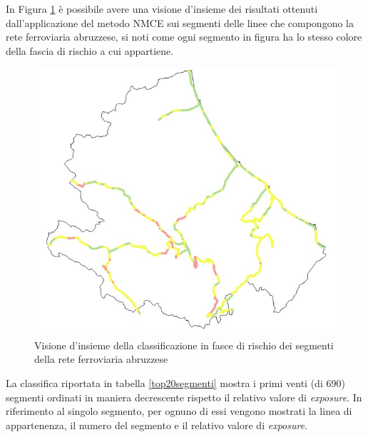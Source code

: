 In Figura \ref{rankinglinee} è possibile avere una visione d'insieme dei risultati ottenuti dall'applicazione del metodo NMCE sui segmenti delle linee che compongono la rete ferroviaria abruzzese, si noti come ogni segmento in figura ha lo stesso colore della fascia di rischio a cui appartiene.
\begin{figure}[h]
	\centering
	\includegraphics[width=0.4\linewidth]{img/reteRanking.jpeg}
	\caption{Visione d'insieme della classificazione in fasce di rischio dei segmenti della rete ferroviaria abruzzese}
	\label{rankinglinee}
\end{figure}
\newpage
La classifica riportata in tabella \ref{top20segmenti} mostra i primi venti (di $690$) segmenti ordinati in maniera decrescente rispetto il relativo valore di \textit{exposure}. In riferimento al singolo segmento, per ognuno di essi vengono mostrati la linea di appartenenza, il numero del segmento e il relativo valore di \textit{exposure}.
